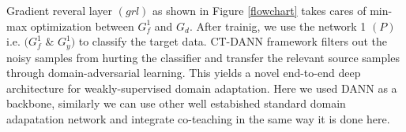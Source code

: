 Gradient reveral layer $(grl)$ \cite{uda} as shown in Figure \ref{flowchart} takes cares of min-max optimization between $G_{f}^1$ and $G_d$. After trainig, we use the network 1 $(P)$ i.e. $(G_{f}^1$ \& $G_{y}^1)$ to classify the target data. CT-DANN framework filters out the noisy samples from
hurting the classifier and transfer the relevant source samples through domain-adversarial learning. This yields a novel end-to-end deep architecture for weakly-supervised domain adaptation. Here we used DANN as a backbone, similarly we can use other well estabished standard domain adapatation network and integrate co-teaching in the same way it is done here.